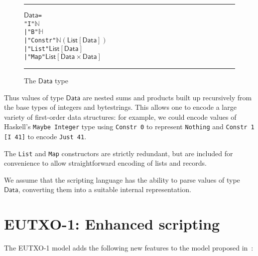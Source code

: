 \documentclass[a4paper]{article}
\newcommand{\s}{\textsf}  %
\newcommand\rfskip{7pt}
\newenvironment{ruledfigure}[1]{\begin{figure}[#1]\hrule\vspace{\rfskip}}{\vspace{\rfskip}\hrule\end{figure}}
\newcommand{\List}[1]{\ensuremath{\s{List}[#1]}}
\newcommand{\Data}{\ensuremath{\mathsf{Data}}}
\newcommand\N{\ensuremath{\mathbb{N}}}
\renewcommand\H{\ensuremath{\mathbb{H}}}
\begin{document}
\begin{ruledfigure}{H}
\begin{alltt}
  \Data =
      "I" \(\N\)
    | "B" \(\H\)
    | "Constr" \(\N (\List{\Data})\)
    | "List" \(\List{\Data}\)
    | "Map" \(\List{\Data\times\Data}\)
\end{alltt}
\caption{The \Data{} type}
\label{fig:data-defn}
\end{ruledfigure}

\noindent Thus values of type \Data{} are nested sums and products
built up recursively from the base types of integers and
bytestrings. This allows one to encode a large variety of first-order
data structures: for example, we could encode values of Haskell's
\verb|Maybe Integer| type using \verb|Constr 0| to represent
\verb|Nothing| and \verb|Constr 1 [I 41]| to encode \verb|Just 41|.


The \texttt{List} and \texttt{Map} constructors are strictly
redundant, but are included for convenience to allow straightforward
encoding of lists and records.

We assume that the scripting language has the ability to parse values
of type \Data{}, converting them into a suitable internal representation.






\section{EUTXO-1: Enhanced scripting}
\label{sec:eutxo-1}
The EUTXO-1 model adds the following new features to the model
proposed in~\citep{Zahnentferner18-UTxO}:
\end{document}
